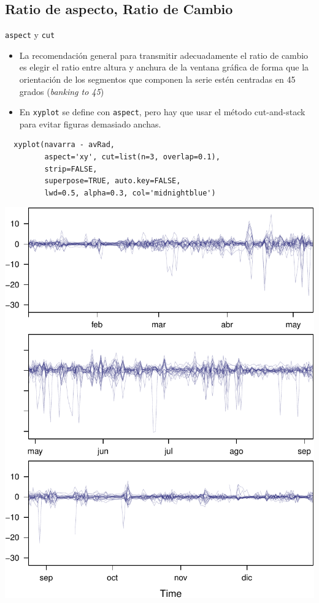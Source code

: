 \documentclass[xcolor={usenames,svgnames,dvipsnames}]{beamer}
\begin{document}
\subsection{Ratio de aspecto, Ratio de Cambio}
\label{sec-3-2}

\begin{frame}[fragile,label=sec-3-2-1]{\texttt{aspect} y \texttt{cut}}
 \begin{itemize}
\item La recomendación general para transmitir adecuadamente el ratio de
cambio es elegir el ratio entre altura y anchura de la ventana
gráfica de forma que la orientación de los segmentos que componen la
serie estén centradas en 45 grados (\emph{banking to 45})
\item En \texttt{xyplot} se define con \texttt{aspect}, pero hay que usar el método
cut-and-stack para evitar figuras demasiado anchas.
\end{itemize}
\lstset{language=R,label= ,caption= ,numbers=none}
\begin{lstlisting}
  xyplot(navarra - avRad,
         aspect='xy', cut=list(n=3, overlap=0.1),
         strip=FALSE,
         superpose=TRUE, auto.key=FALSE,
         lwd=0.5, alpha=0.3, col='midnightblue')
\end{lstlisting}
\end{frame}

\begin{frame}[label=sec-3-2-2]{}
\includegraphics[width=.9\linewidth]{figs/navarraBanking.pdf}
\end{frame}
\end{document}
